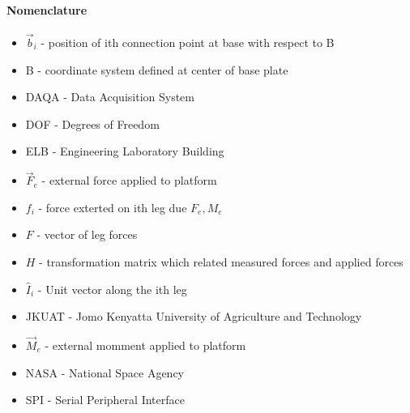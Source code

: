 \paragraph{Nomenclature}
\begin{itemize}
\item $\vec{b}_i$ - position of ith connection point at base with respect to B
\item B - coordinate system defined at center of base plate
\item DAQA - Data Acquisition System
\item DOF - Degrees of Freedom
\item ELB - Engineering Laboratory Building
\item $\vec{F}_e$ - external force applied to platform
\item $f_i$ - force exterted on ith leg due $F_e, M_e$
\item $F$ - vector of leg forces
\item $H$ - transformation matrix which related measured forces and applied forces
\item $\hat{I}_i$ - Unit vector along the ith leg 
\item JKUAT - Jomo Kenyatta University of Agriculture and Technology
\item $\vec{M}_e$ - external momment applied to platform
\item NASA - National Space Agency
\item SPI - Serial Peripheral Interface
\end{itemize}
\pagebreak